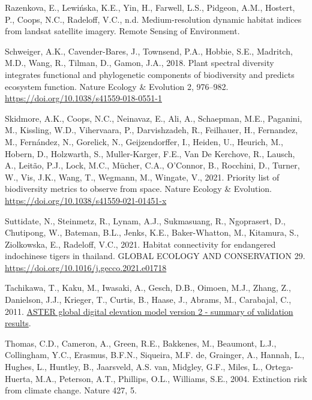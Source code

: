 \documentclass[
]{agujournal2019}
\newlength{\cslhangindent}
\newenvironment{CSLReferences}[2] %
 {\begin{list}{}{%
  \setlength{\itemindent}{0pt}
  \setlength{\leftmargin}{0pt}
  \setlength{\parsep}{0pt}
  \ifodd #1
   \setlength{\leftmargin}{\cslhangindent}
   \setlength{\itemindent}{-1\cslhangindent}
  \fi
  \setlength{\itemsep}{#2\baselineskip}}}
 {\end{list}}
\begin{document}
\begin{CSLReferences}{1}{0}
Razenkova, E., Lewińska, K.E., Yin, H., Farwell, L.S., Pidgeon, A.M.,
Hostert, P., Coops, N.C., Radeloff, V.C., n.d. Medium-resolution dynamic
habitat indices from landsat satellite imagery. Remote Sensing of
Environment.

Schweiger, A.K., Cavender-Bares, J., Townsend, P.A., Hobbie, S.E.,
Madritch, M.D., Wang, R., Tilman, D., Gamon, J.A., 2018. Plant spectral
diversity integrates functional and phylogenetic components of
biodiversity and predicts ecosystem function. Nature Ecology \&
Evolution 2, 976--982. \url{https://doi.org/10.1038/s41559-018-0551-1}

Skidmore, A.K., Coops, N.C., Neinavaz, E., Ali, A., Schaepman, M.E.,
Paganini, M., Kissling, W.D., Vihervaara, P., Darvishzadeh, R.,
Feilhauer, H., Fernandez, M., Fernández, N., Gorelick, N.,
Geijzendorffer, I., Heiden, U., Heurich, M., Hobern, D., Holzwarth, S.,
Muller-Karger, F.E., Van De Kerchove, R., Lausch, A., Leitão, P.J.,
Lock, M.C., Mücher, C.A., O'Connor, B., Rocchini, D., Turner, W., Vis,
J.K., Wang, T., Wegmann, M., Wingate, V., 2021. Priority list of
biodiversity metrics to observe from space. Nature Ecology \& Evolution.
\url{https://doi.org/10.1038/s41559-021-01451-x}

Suttidate, N., Steinmetz, R., Lynam, A.J., Sukmasuang, R., Ngoprasert,
D., Chutipong, W., Bateman, B.L., Jenks, K.E., Baker-Whatton, M.,
Kitamura, S., Ziolkowska, E., Radeloff, V.C., 2021. Habitat connectivity
for endangered indochinese tigers in thailand. GLOBAL ECOLOGY AND
CONSERVATION 29. \url{https://doi.org/10.1016/j.gecco.2021.e01718}

Tachikawa, T., Kaku, M., Iwasaki, A., Gesch, D.B., Oimoen, M.J., Zhang,
Z., Danielson, J.J., Krieger, T., Curtis, B., Haase, J., Abrams, M.,
Carabajal, C., 2011.
\href{http://pubs.er.usgs.gov/publication/70005960}{ASTER global digital
elevation model version 2 - summary of validation results}.

Thomas, C.D., Cameron, A., Green, R.E., Bakkenes, M., Beaumont, L.J.,
Collingham, Y.C., Erasmus, B.F.N., Siqueira, M.F. de, Grainger, A.,
Hannah, L., Hughes, L., Huntley, B., Jaarsveld, A.S. van, Midgley, G.F.,
Miles, L., Ortega-Huerta, M.A., Peterson, A.T., Phillips, O.L.,
Williams, S.E., 2004. Extinction risk from climate change. Nature 427,
5.


\end{CSLReferences}
\end{document}
